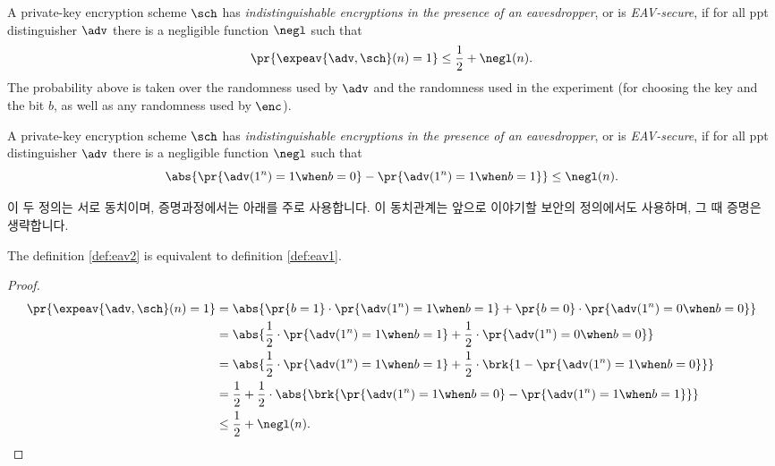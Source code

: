 \begin{definition} \label{def:eav1}
    A private-key encryption scheme $\sch$ has \emph{indistinguishable encryptions in the presence of an eavesdropper}, or is \emph{EAV-secure}, if for all ppt distinguisher $\adv$ there is a negligible function $\negl$ such that
    \begin{equation}
        \pr{\expeav{\adv, \sch}(n) = 1} \le \frac{1}{2} + \negl(n).
    \end{equation}
    The probability above is taken over the randomness used by $\adv$ and the randomness used in the experiment (for choosing the key and the bit $b$, as well as any randomness used by $\enc$).
\end{definition}

\begin{definition} \label{def:eav2}
    A private-key encryption scheme $\sch$ has \emph{indistinguishable encryptions in the presence of an eavesdropper}, or is \emph{EAV-secure}, if for all ppt distinguisher $\adv$ there is a negligible function $\negl$ such that
    \begin{equation}
        \abs{
            \pr{\adv(1^n) = 1 \when b = 0} - \pr{\adv(1^n) = 1 \when b = 1}
        } \le \negl(n).
    \end{equation}
\end{definition}

이 두 정의는 서로 동치이며, 증명과정에서는 아래를 주로 사용합니다. 이 동치관계는 앞으로 이야기할 보안의 정의에서도 사용하며, 그 때 증명은 생략합니다.

\begin{proposition}
    The definition \ref{def:eav2} is equivalent to  definition \ref{def:eav1}.
    \label{pro:same_def}
\end{proposition}

\begin{proof}
    \begin{equation}
        \begin{split}
            \pr{\expeav{\adv, \sch}(n) = 1}
            &= \abs{\pr{b = 1} \cdot \pr{\adv(1^n) = 1 \when b = 1} + \pr{b = 0} \cdot \pr{\adv(1^n) = 0 \when b = 0}} \\
            &= \abs{\frac{1}{2} \cdot \pr{\adv(1^n) = 1 \when b = 1} + \frac{1}{2} \cdot \pr{\adv(1^n) = 0 \when b = 0}} \\
            &= \abs{\frac{1}{2} \cdot \pr{\adv(1^n) = 1 \when b = 1} + \frac{1}{2} \cdot \brk{ 1 - \pr{\adv(1^n) = 1 \when b = 0} }} \\
            &= \frac{1}{2} + \frac{1}{2} \cdot \abs{\brk{ \pr{\adv(1^n) = 1 \when b = 0} - \pr{\adv(1^n) = 1 \when b = 1} }} \\
            &\le \frac{1}{2} + \negl(n).
        \end{split}
    \end{equation}
\end{proof}

